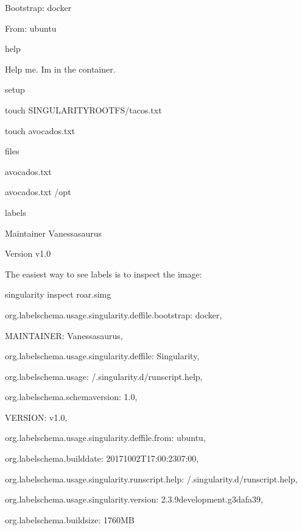 \documentclass[letterpaper,10pt,english]{sphinxmanual}
\begin{document}
%
\begin{sphinxVerbatim}[commandchars=\\\{\}]
Bootstrap: docker

From: ubuntu


\PYGZpc{}help

Help me. I\PYGZsq{}m in the container.


\PYGZpc{}setup

    touch \PYGZdl{}\PYGZob{}SINGULARITY\PYGZus{}ROOTFS\PYGZcb{}/tacos.txt

    touch avocados.txt


\PYGZpc{}files

    avocados.txt

    avocados.txt /opt


\PYGZpc{}labels

    Maintainer Vanessasaurus

    Version v1.0
\end{sphinxVerbatim}

The easiest way to see labels is to inspect the image:

%
\begin{sphinxVerbatim}[commandchars=\\\{\}]
\PYGZdl{} singularity inspect roar.simg

\PYGZob{}

    \PYGZdq{}org.label\PYGZhy{}schema.usage.singularity.deffile.bootstrap\PYGZdq{}: \PYGZdq{}docker\PYGZdq{},

    \PYGZdq{}MAINTAINER\PYGZdq{}: \PYGZdq{}Vanessasaurus\PYGZdq{},

    \PYGZdq{}org.label\PYGZhy{}schema.usage.singularity.deffile\PYGZdq{}: \PYGZdq{}Singularity\PYGZdq{},

    \PYGZdq{}org.label\PYGZhy{}schema.usage\PYGZdq{}: \PYGZdq{}/.singularity.d/runscript.help\PYGZdq{},

    \PYGZdq{}org.label\PYGZhy{}schema.schema\PYGZhy{}version\PYGZdq{}: \PYGZdq{}1.0\PYGZdq{},

    \PYGZdq{}VERSION\PYGZdq{}: \PYGZdq{}v1.0\PYGZdq{},

    \PYGZdq{}org.label\PYGZhy{}schema.usage.singularity.deffile.from\PYGZdq{}: \PYGZdq{}ubuntu\PYGZdq{},

    \PYGZdq{}org.label\PYGZhy{}schema.build\PYGZhy{}date\PYGZdq{}: \PYGZdq{}2017\PYGZhy{}10\PYGZhy{}02T17:00:23\PYGZhy{}07:00\PYGZdq{},

    \PYGZdq{}org.label\PYGZhy{}schema.usage.singularity.runscript.help\PYGZdq{}: \PYGZdq{}/.singularity.d/runscript.help\PYGZdq{},

    \PYGZdq{}org.label\PYGZhy{}schema.usage.singularity.version\PYGZdq{}: \PYGZdq{}2.3.9\PYGZhy{}development.g3dafa39\PYGZdq{},

    \PYGZdq{}org.label\PYGZhy{}schema.build\PYGZhy{}size\PYGZdq{}: \PYGZdq{}1760MB\PYGZdq{}

\PYGZcb{}
\end{sphinxVerbatim}
\end{document}
